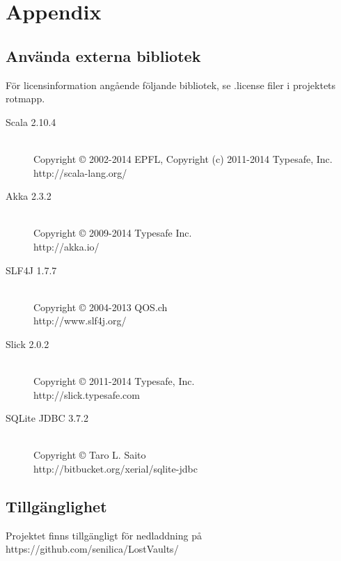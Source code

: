 \documentclass[a4paper]{article}
\begin{document}
\section{Appendix}
\subsection{Använda externa bibliotek}
För licensinformation angående följande bibliotek, se .license filer i projektets rotmapp.
\begin{description}
\item[Scala 2.10.4] \hfill \\ Copyright © 2002-2014 EPFL, Copyright (c) 2011-2014 Typesafe, Inc.\hfill \\http://scala-lang.org/
\item[Akka 2.3.2] \hfill \\ Copyright © 2009-2014 Typesafe Inc.\hfill \\ http://akka.io/
\item[SLF4J 1.7.7] \hfill \\ Copyright © 2004-2013 QOS.ch\hfill \\ http://www.slf4j.org/
\item[Slick 2.0.2] \hfill \\ Copyright © 2011-2014 Typesafe, Inc.\hfill \\ http://slick.typesafe.com
\item[SQLite JDBC 3.7.2] \hfill \\ Copyright © Taro L. Saito\hfill \\ http://bitbucket.org/xerial/sqlite-jdbc
\end{description}

\subsection{Tillgänglighet}
Projektet finns tillgängligt för nedladdning på https://github.com/senilica/LostVaults/
\end{document}

